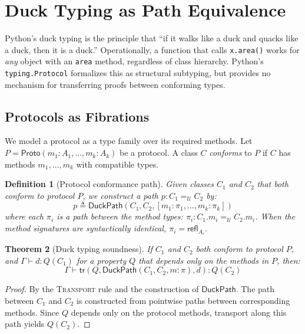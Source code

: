 \documentclass[acmsmall,nonacm,screen]{acmart}
\newtheorem{theorem}{Theorem}[section]
\newtheorem{definition}[theorem]{Definition}
\newcommand{\syntype}[1]{\ensuremath{\mathsf{#1}}}
\newcommand{\pyproto}[1]{\syntype{Proto}(#1)}
\newcommand{\pathtype}[3]{#2 =_{#1} #3}
\newcommand{\universe}{\mathcal{U}}
\newcommand{\ctx}{\Gamma}
\newcommand{\jdg}[3]{#1 \vdash #2 : #3}
\newcommand{\refl}[1]{\syntype{refl}_{#1}}
\newcommand{\transport}[3]{\syntype{tr}(#1, #2, #3)}
\newcommand{\duckpath}{\ensuremath{\syntype{DuckPath}}}
\begin{document}
\section{Duck Typing as Path Equivalence}\label{sec:duck}

Python's duck typing is the principle that ``if it walks like a duck
and quacks like a duck, then it is a duck.''  Operationally, a
function that calls \texttt{x.area()} works for \emph{any} object
with an \texttt{area} method, regardless of class hierarchy.  Python's
\texttt{typing.Protocol} formalizes this as structural subtyping, but
provides no mechanism for transferring proofs between conforming types.

\subsection{Protocols as Fibrations}

We model a protocol as a type family over its required methods.  Let
$P = \pyproto{m_1 : A_1, \ldots, m_k : A_k}$ be a protocol.  A
class $C$ \emph{conforms} to $P$ if $C$ has methods $m_1, \ldots, m_k$
with compatible types.

\begin{definition}[Protocol conformance path]
Given classes $C_1$ and $C_2$ that both conform to protocol $P$, we
construct a path $p : \pathtype{\universe}{C_1}{C_2}$ by:
\[
  p \triangleq \duckpath(C_1, C_2,
    [m_1 : \pi_1, \ldots, m_k : \pi_k])
\]
where each $\pi_i$ is a path between the method types:
$\pi_i : \pathtype{\universe}{C_1.m_i}{C_2.m_i}$.  When the method
signatures are syntactically identical, $\pi_i = \refl{A_i}$.
\end{definition}

\begin{theorem}[Duck typing soundness]\label{thm:duck}
If $C_1$ and $C_2$ both conform to protocol $P$, and
$\jdg{\ctx}{d}{Q(C_1)}$ for a property $Q$ that depends only on the
methods in $P$, then:
\[
  \jdg{\ctx}{\transport{Q}{\duckpath(C_1,C_2,\overline{m:\pi})}{d}}{Q(C_2)}
\]
\end{theorem}

\begin{proof}
By the \textsc{Transport} rule and the construction of \duckpath{}.
The path between $C_1$ and $C_2$ is constructed from pointwise paths
between corresponding methods.  Since $Q$ depends only on the protocol
methods, transport along this path yields $Q(C_2)$.
\end{proof}
\end{document}
